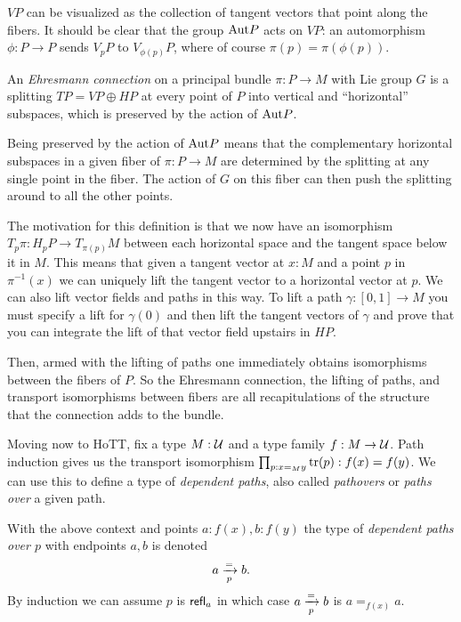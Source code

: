 \( VP \) can be visualized as the collection of tangent vectors that point along the fibers. It should be clear that the group \( \mathrm{Aut} P \) acts on \( VP \): an automorphism \( \phi:P\to P \) sends \( V_pP \) to \( V_{\phi(p)}P \), where of course \( \pi(p)=\pi(\phi(p)) \).

\begin{mydef}
An \emph{Ehresmann connection} on a principal bundle \( \pi:P\to M \) with Lie group \( G \) is a splitting \( TP=VP\oplus HP \) at every point of \( P \) into vertical and ``horizontal'' subspaces, which is preserved by the action of \( \mathrm{Aut} P \).
\end{mydef}

Being preserved by the action of \( \mathrm{Aut} P \) means that the complementary horizontal subspaces in a given fiber of \( \pi:P\to M \) are determined by the splitting at any single point in the fiber. The action of \( G \) on this fiber can then push the splitting around to all the other points.

The motivation for this definition is that we now have an isomorphism \( T_p\pi:H_pP\to T_{\pi(p)}M \) between each horizontal space and the tangent space below it in \( M \). This means that given a tangent vector at \( x:M \) and a point \( p \) in \( \pi^{-1}(x) \) we can uniquely lift the tangent vector to a horizontal vector at \( p \). We can also lift vector fields and paths in this way. To lift a path \( \gamma:[0,1]\to M \) you must specify a lift for \( \gamma(0) \) and then lift the tangent vectors of \( \gamma \) and prove that you can integrate the lift of that vector field upstairs in \( HP \).

Then, armed with the lifting of paths one immediately obtains isomorphisms between the fibers of \( P \). So the Ehresmann connection, the lifting of paths, and transport isomorphisms between fibers are all recapitulations of the structure that the connection adds to the bundle.

Moving now to HoTT, fix a type \( M:\mathcal{U} \) and a type family \( f:M\to\mathcal{U} \). Path induction gives us the transport isomorphism \( \prod_{p:x=_M y}\mathrm{tr}(p):f(x)=f(y) \). We can use this to define a type of \emph{dependent paths}, also called \emph{pathovers} or \emph{paths over} a given path.

\begin{mydef}
With the above context and points \( a:f(x), b:f(y) \) the type of \emph{dependent paths over \( p \)} with endpoints \( a, b \) is denoted
\[ a\xrightarrow[{p}]{=}b.
\]
By induction we can assume \( p \) is \( \mathsf{refl}_a \) in which case \( a\xrightarrow[{p}]{=}b \) is \( a=_{f(x)}a \).
\end{mydef}

